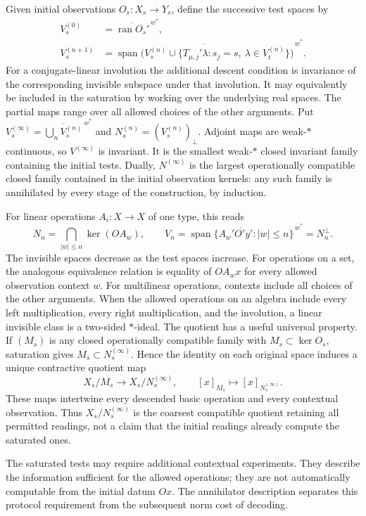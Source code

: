 \documentclass[11pt,a4paper]{amsart}
\numberwithin{equation}{section}
\theoremstyle{definition}
\theoremstyle{remark}
\DeclareMathOperator{\ran}{ran}
\DeclareMathOperator{\Span}{span}
\begin{document}
Given initial observations $O_s:X_s\to Y_s$, define the successive test spaces by
\[
 \begin{split}
 V_s^{(0)}&=\overline{\ran O_s'}^{\,w^*},\\
 V_s^{(n+1)}&=\overline{\Span\big(V_s^{(n)}\cup
 \{T_{\mu,j}'\lambda:s_j=s,\ \lambda\in V_t^{(n)}\}\big)}^{\,w^*}.
 \end{split}
\]
For a conjugate-linear involution the additional descent condition is invariance of the corresponding invisible subspace under that involution. It may equivalently be included in the saturation by working over the underlying real spaces. The partial maps range over all allowed choices of the other arguments. Put
$V_s^{(\infty)}=\overline{\bigcup_nV_s^{(n)}}^{\,w^*}$ and
$N_s^{(n)}=(V_s^{(n)})_\perp$. Adjoint maps are weak-$*$ continuous, so $V^{(\infty)}$ is invariant. It is the smallest weak-$*$ closed invariant family containing the initial tests. Dually, $N^{(\infty)}$ is the largest operationally compatible closed family contained in the initial observation kernels: any such family is annihilated by every stage of the construction, by induction.

For linear operations $A_i:X\to X$ of one type, this reads
\begin{equation}\label{eq:word-observability}
 N_n=\bigcap_{|w|\le n}\ker(OA_w),\qquad
 V_n=\overline{\Span\{A_w'O'y':|w|\le n\}}^{\,w^*}=N_n^\perp.
\end{equation}
The invisible spaces decrease as the test spaces increase. For operations on a set, the analogous equivalence relation is equality of $OA_wx$ for every allowed observation context $w$. For multilinear operations, contexts include all choices of the other arguments. When the allowed operations on an algebra include every left multiplication, every right multiplication, and the involution, a linear invisible class is a two-sided $*$-ideal.
The quotient has a useful universal property. If $(M_s)$ is any closed operationally compatible family with $M_s\subset\ker O_s$, saturation gives $M_s\subset N_s^{(\infty)}$. Hence the identity on each original space induces a unique contractive quotient map
\[
 X_s/M_s\longrightarrow X_s/N_s^{(\infty)},\qquad
 [x]_{M_s}\longmapsto[x]_{N_s^{(\infty)}}.
\]
These maps intertwine every descended basic operation and every contextual observation. Thus $X_s/N_s^{(\infty)}$ is the coarsest compatible quotient retaining all permitted readings, not a claim that the initial readings already compute the saturated ones.

The saturated tests may require additional contextual experiments. They describe the information sufficient for the allowed operations; they are not automatically computable from the initial datum $Ox$. The annihilator description separates this protocol requirement from the subsequent norm cost of decoding.
\end{document}
